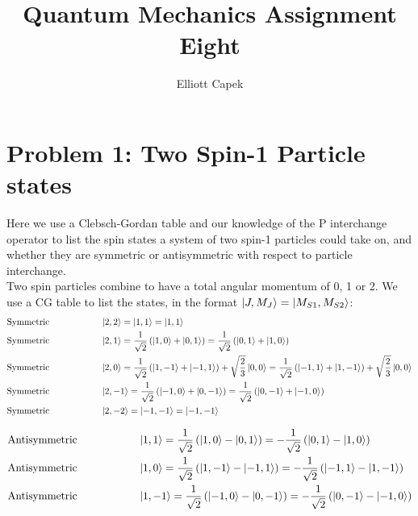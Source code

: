 \documentclass[10pt]{article} %
\title{Quantum Mechanics Assignment Eight}
\author{Elliott Capek}
\begin{document}
\maketitle{}

\section{Problem 1: Two Spin-1 Particle states}
Here we use a Clebsch-Gordan table and our knowledge of the P interchange operator
to list the spin states a system of two spin-1 particles could take on, and whether
they are symmetric or antisymmetric with respect to particle interchange.\\

Two spin particles combine to have a total angular momentum of 0, 1 or 2. We use a CG
table to list the states, in the format $\ket{J,M_J} = \ket{M_{S1}, M_{S2}}$:\\

\begin{align*}
  \mbox{Symmetric}\hspace{2cm} &\ket{2,2} = \ket{1,1} = \ket{1,1}\\
  \mbox{Symmetric}\hspace{2cm}&\ket{2,1} = \frac{1}{\sqrt{2}}\left(\ket{1,0}
  + \ket{0,1}\right)
  = \frac{1}{\sqrt{2}}\left(\ket{0,1} + \ket{1,0}\right)\\
  \mbox{Symmetric}\hspace{2cm} &\ket{2,0} =
  \frac{1}{\sqrt{2}}\left(\ket{1,-1} + \ket{-1,1}\right) + \sqrt{\frac{2}{3}}\ket{0,0}
  = \frac{1}{\sqrt{2}}\left(\ket{-1,1} + \ket{1,-1}\right)
  + \sqrt{\frac{2}{3}}\ket{0,0}\\
  \mbox{Symmetric}\hspace{2cm} &\ket{2,-1} =
  \frac{1}{\sqrt{2}}\left(\ket{-1,0} + \ket{0,-1}\right)
  = \frac{1}{\sqrt{2}}\left(\ket{0,-1} + \ket{-1,0}\right)\\
  \mbox{Symmetric}\hspace{2cm} &\ket{2,-2} = \ket{-1,-1} = \ket{-1,-1}\\
\end{align*}

\begin{align*}
  \mbox{Antisymmetric}\hspace{2cm} &\ket{1,1}
  = \frac{1}{\sqrt{2}}\left(\ket{1,0} - \ket{0,1}\right)
  = -\frac{1}{\sqrt{2}}\left(\ket{0,1} - \ket{1,0}\right)\\
  \mbox{Antisymmetric}\hspace{2cm} &\ket{1,0}
  = \frac{1}{\sqrt{2}}\left(\ket{1,-1} - \ket{-1,1}\right)
  = -\frac{1}{\sqrt{2}}\left(\ket{-1,1} - \ket{1,-1}\right)\\
  \mbox{Antisymmetric}\hspace{2cm} &\ket{1,-1}
  = \frac{1}{\sqrt{2}}\left(\ket{-1,0} - \ket{0,-1}\right)
  = -\frac{1}{\sqrt{2}}\left(\ket{0,-1} - \ket{-1,0}\right)\\
\end{align*}
\end{document}
